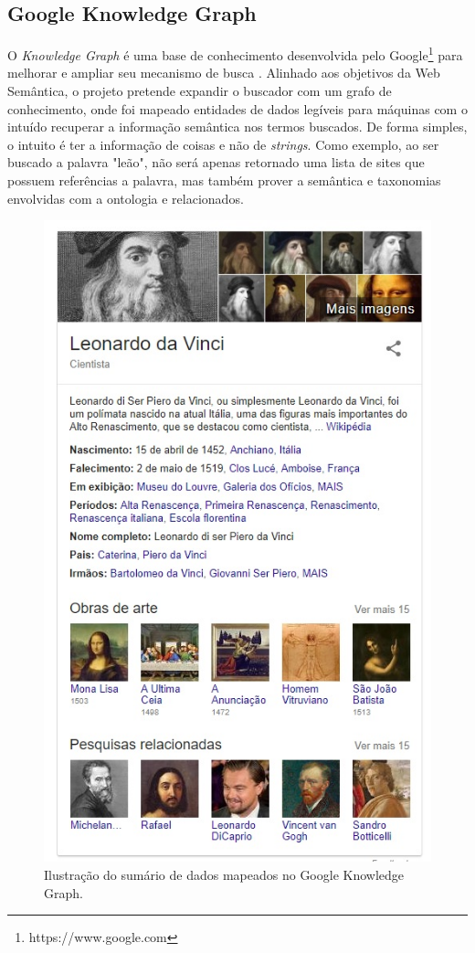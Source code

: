 \subsection{Google Knowledge Graph}

O \textit{Knowledge Graph} é uma base de conhecimento desenvolvida pelo Google\footnote{https://www.google.com} para melhorar e ampliar seu mecanismo de busca \citep{GoogleKnowledge}. Alinhado aos objetivos da Web Semântica, o projeto pretende expandir o buscador com um grafo de conhecimento, onde foi mapeado entidades de dados legíveis para máquinas com o intuído recuperar a informação semântica nos termos buscados. De forma simples, o intuito é ter a informação de coisas e não de \textit{strings}. Como exemplo, ao ser buscado a palavra "leão", não será apenas retornado uma lista de sites que possuem referências a palavra, mas também prover a semântica e taxonomias envolvidas com a ontologia e relacionados.

\begin{figure}
	\centering
	\includegraphics[scale=0.55]{imagens/knowledge_graph.jpg}
	\caption{Ilustração do sumário de dados mapeados no Google Knowledge Graph.}
	\label{fig:knowledge-graph}
\end{figure}

